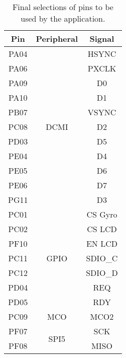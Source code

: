 \begin{table}[ht!]
\begin{center}
\begin{tabular}{| c | c | c |}
\hline
Pin	&	Peripheral	&	Signal\\ \hline
PA04	&	\multirow{11}{*}{DCMI}	&	HSYNC\\
PA06	&		&	PXCLK\\
PA09	&		&	D0\\
PA10	&		&	D1\\
PB07	&		&	VSYNC\\
PC08	&		&	D2\\
PD03	&		&	D5\\
PE04	&		&	D4\\
PE05	&		&	D6\\
PE06	&		&	D7\\
PG11	&		&	D3\\ \hline
PC01	&	\multirow{7}{*}{GPIO}	&	CS Gyro\\
PC02	&		&	CS LCD\\
PF10	&		&	EN LCD\\ 
PC11	&		&	SDIO_C\\
PC12	&		&	SDIO_D\\
PD04	&		&	REQ\\
PD05	&		&	RDY\\ \hline
PC09	&	MCO	&	MCO2\\ \hline
PF07	&	\multirow{2}{*}{SPI5}	&	SCK\\
PF08	&		&	MISO\\ \hline
\end{tabular}
\caption[Final selections of pins.]{Final selections of pins to be used by the application.}
\label{tab_boardpin_final}
\end{center}
\end{table}
